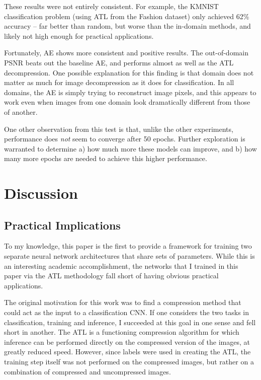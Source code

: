 \documentclass[twoside,11pt]{article}
\begin{document}
These results were not entirely consistent. For example, the KMNIST classification problem
(using ATL from the Fashion dataset) only achieved 62\% accuracy -- far better than random,
but worse than the in-domain methods, and likely not high enough for practical
applications.

Fortunately, AE shows more consistent and positive results.
The out-of-domain PSNR beats out the baseline
AE, and performs almost as well as the ATL decompression. 
One possible explanation for this finding is that
domain does not matter as much for image decompression as it does for classification. In all
domains, the AE is simply trying to reconstruct image pixels, and this appears to work even 
when images from one domain look dramatically different from those of another.

One other observation from this test is that, unlike the other experiments, performance does \emph{not}
seem to converge after 50 epochs. Further exploration is warranted to determine a)
how much more these models can improve, and b) how many more epochs are needed to achieve
this higher performance.








\section{Discussion}

\subsection{Practical Implications}

To my knowledge, this paper is the first to provide a framework for training two 
separate neural network architectures that share sets of parameters. 
While this is an interesting academic accomplishment, the networks that I trained 
in this paper via the ATL methodology fall short of having obvious practical applications.

The original motivation for this work was to find a compression method that could act as
the input to a classification CNN. If one considers the two tasks in classification,
training and inference, I succeeded at this goal in one sense and fell short in another. 
The ATL is a functioning compression algorithm for which inference can be performed directly
on the compressed version of the images, at greatly reduced speed. However, since labels
were used in creating the ATL, the training step itself was not performed on the compressed 
images, but rather on a combination of compressed and uncompressed images. 
\end{document}
